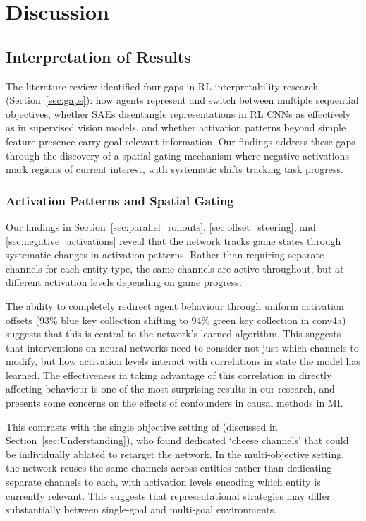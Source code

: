 \chapter{Discussion}
\label{ch:discussion}

\section{Interpretation of Results}
\label{sec:interpretation}

The literature review identified four gaps in RL interpretability research (Section~\ref{sec:gaps}): how agents represent and switch between multiple sequential objectives, whether SAEs disentangle representations in RL CNNs as effectively as in supervised vision models, and whether activation patterns beyond simple feature presence carry goal-relevant information. Our findings address these gaps through the discovery of a spatial gating mechanism where negative activations mark regions of current interest, with systematic shifts tracking task progress.

\subsection{Activation Patterns and Spatial Gating}
Our findings in Section~\ref{sec:parallel_rollouts}, \ref{sec:offset_steering}, and \ref{sec:negative_activations} reveal that the network tracks game states through systematic changes in activation patterns. Rather than requiring separate channels for each entity type, the same channels are active throughout, but at different activation levels depending on game progress.

The ability to completely redirect agent behaviour through uniform activation offsets (93\% blue key collection shifting to 94\% green key collection in conv4a) suggests that this is central to the network's learned algorithm. This suggests that interventions on neural networks need to consider not just which channels to modify, but how activation levels interact with correlations in state the model has learned. The effectiveness in taking advantage of this correlation in directly affecting behaviour is one of the most surprising results in our research, and presents some concerns on the effects of confounders in causal methods in MI.

This contrasts with the single objective setting of \citet{mini_2023_understanding} (discussed in Section~\ref{sec:Understanding}), who found dedicated `cheese channels' that could be individually ablated to retarget the network. In the multi-objective setting, the network reuses the same channels across entities rather than dedicating separate channels to each, with activation levels encoding which entity is currently relevant. This suggests that representational strategies may differ substantially between single-goal and multi-goal environments.

